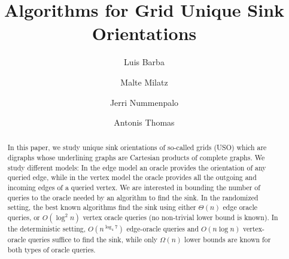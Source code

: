\documentclass[runningheads,a4paper]{llncs}
\begin{document}
\mainmatter  %

\title{Algorithms for Grid Unique Sink Orientations}


%
%
\author{Luis Barba \and Malte Milatz \and Jerri Nummenpalo \and Antonis Thomas}%

%


%
%

\maketitle

\begin{abstract}
\noindent
 In this paper, we study unique sink orientations of so-called grids (USO) which are digraphs whose underlining graphs are Cartesian products of complete graphs. We study different models: In the edge model an oracle provides the orientation of any queried edge, while in the vertex model the oracle provides all the outgoing and incoming edges of a queried vertex. We are interested in bounding the number of queries to the oracle needed by an algorithm to find the sink. 
In the randomized setting, the best known algorithms find the sink using either $\Theta(n)$ edge oracle queries, or $O(\log^2 n)$ vertex oracle queries (no non-trivial lower bound is known). In the deterministic setting, $O(n^{\log_4 7})$ edge-oracle queries and $O(n \log n)$ vertex-oracle queries suffice to find the sink, while only $\Omega(n)$ lower bounds are known for both types of oracle queries.
\end{abstract}
\end{document}
